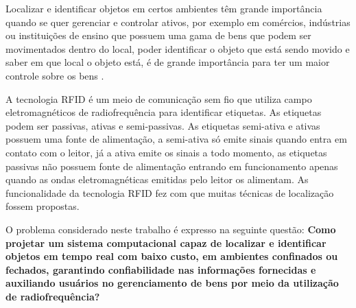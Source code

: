 \par
\begin{comment}
Os edifícios e construções dificultam o envio de sinais de rádio emitidos pelos satélites e dispositivos que fazem uso do GPS,
por essa questão sua utilização torna-se inviável para aplicações que consistem em localizar objetos em ambientes fechados,
além que o tempo-de-luz transitório fica difícil e caro para fazer sua medição \cite{rfid2009review}.
\end{comment}


Localizar e identificar objetos em certos ambientes têm grande importância quando se quer gerenciar e controlar ativos,
por exemplo em comércios, indústrias ou instituições de ensino que possuem uma gama de bens que podem ser movimentados dentro do local,
poder identificar o objeto que está sendo movido e saber em que local o objeto está, é de grande importância para ter um maior
controle sobre os bens \cite{realtimeRFID2016}.

A tecnologia RFID é um meio de comunicação sem fio que utiliza campo eletromagnéticos de
radiofrequência para identificar etiquetas. As etiquetas podem ser passivas, ativas e
semi-passivas. As etiquetas semi-ativa e ativas possuem uma fonte de alimentação, a semi-ativa só emite sinais
quando entra em contato com o leitor, já a ativa emite os sinais a todo momento, as etiquetas passivas não
possuem fonte de alimentação entrando em funcionamento apenas quando as ondas eletromagnéticas emitidas pelo
leitor os alimentam\cite{realtimeRFID2016}. As funcionalidade da tecnologia RFID fez com que muitas técnicas de localização fossem propostas.

\begin{comment}
\par
Muitas técnicas de localização baseadas em RFID foram propostas, sendo com foco em objetos móveis ou estacionários, contudo algumas dessas
técnicas fazem uso de etiquetas ativas a fim de obter melhores estimativas,
\end{comment}


O problema considerado neste trabalho é expresso na seguinte questão:
\textbf{Como projetar um sistema computacional capaz de localizar e identificar objetos em tempo real com baixo custo, em ambientes confinados ou fechados, garantindo confiabilidade nas informações fornecidas e auxiliando usuários no gerenciamento de bens por meio da utilização de radiofrequência?}

